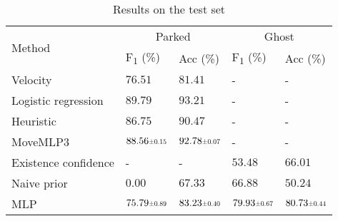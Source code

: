 \documentclass[letterpaper, 10 pt, journal, twoside]{IEEEtran}
\newcommand\scalemath[2]{\scalebox{#1}{\mbox{\ensuremath{\displaystyle #2}}}}
\begin{document}
\begin{table}[!t]
	\scriptsize
	\caption{Results on the test set}
	\vspace{-0.1cm}
	\label{tab:results_test}
	\setlength{\tabcolsep}{1pt}
	\centering
	\begin{tabularx}{\columnwidth}{Xllll}
		\toprule
		\multirow{2}{*}{Method}                      &                              \multicolumn{2}{c}{Parked}                               &                               \multicolumn{2}{c}{Ghost}                               \\
		\cmidrule(lr){2-3}\cmidrule(lr){4-5}         & F\textsubscript{1} (\%)                   & Acc (\%)                                  & F\textsubscript{1} (\%)                   & Acc (\%)                                  \\ \midrule
		Velocity                                     & $76.51$                                   & $81.41$                                   & -                                         & -                                         \\
		Logistic regression                          & $89.79$                                   & $93.21$                                   & -                                         & -                                         \\
		Heuristic \cite{Behrendt2019}                & $86.75$                                   & $90.47$                                   & -                                         & -                                         \\
		MoveMLP3 \cite{Behrendt2019}                 & $88.56\scalemath{0.7}{\pm 0.15}$          & $92.78\scalemath{0.7}{\pm 0.07}$          & -                                         & -                                         \\ \midrule
		Existence confidence \cite{Aeberhard2011}    & -                                         & -                                         & $53.48$                                   & $66.01$                                   \\ \midrule
		Naive prior                                  & $0.00$                                    & $67.33$                                   & $66.88$                                   & $50.24$                                   \\
		MLP                                          & $75.79\scalemath{0.7}{\pm 0.89}$          & $83.23\scalemath{0.7}{\pm 0.40}$          & $79.93\scalemath{0.7}{\pm 0.67}$          & $80.73\scalemath{0.7}{\pm 0.44}$          \\

\end{tabularx}
\end{table}
\end{document}
